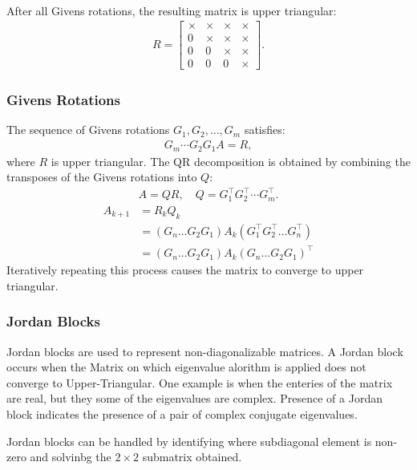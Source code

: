 \documentclass{beamer}
\theoremstyle{remark}
\numberwithin{equation}{section}
\begin{document}
\begin{frame}
{\begin{align}
        \end{align}
        }
        After all Givens rotations, the resulting matrix is upper triangular:
        {\small
        \begin{align}
          R = \begin{bmatrix}
            \times & \times & \times & \times \\
            0 & \times & \times & \times \\
            0 & 0 & \times & \times \\
            0 & 0 & 0 & \times
          \end{bmatrix}.
        \end{align}
        }
      \end{frame}
      \begin{frame}
        \frametitle{Givens Rotations}
        The sequence of Givens rotations $G_1, G_2, \dots, G_m$ satisfies:
        \begin{align}
          G_m \cdots G_2 G_1 A = R,
        \end{align}
        where \(R\) is upper triangular. The QR decomposition is obtained by combining the transposes of the Givens rotations into \(Q\):
        \begin{align}
          A = Q R, \quad Q = G_1^{\top} G_2^{\top} \cdots G_m^{\top}.
        \end{align}
        \begin{align}
          A_{k+1}&= R_k Q_k\\
          &=(G_n \dots G_2 G_1)A_k(G_1^{\top}G_2^{\top}\dots G_n^{\top})\\
          &= (G_n \dots G_2 G_1)A_k(G_n \dots G_2 G_1)^{\top}
        \end{align}
        Iteratively repeating this process causes the matrix to converge to upper triangular.
      \end{frame}
      \begin{frame}
        \frametitle{Jordan Blocks}

        Jordan blocks are used to represent non-diagonalizable matrices. A Jordan block occurs when the Matrix on which eigenvalue alorithm is applied does not converge to Upper-Triangular. One example is when the enteries of the matrix are real, but they some of the eigenvalues are complex. Presence of a Jordan block indicates the presence of a pair of complex conjugate eigenvalues. 
      
        Jordan blocks can be handled by identifying where subdiagonal element is non-zero and solvinbg the $2 \times 2$ submatrix obtained.
      \end{frame}
\end{document}
